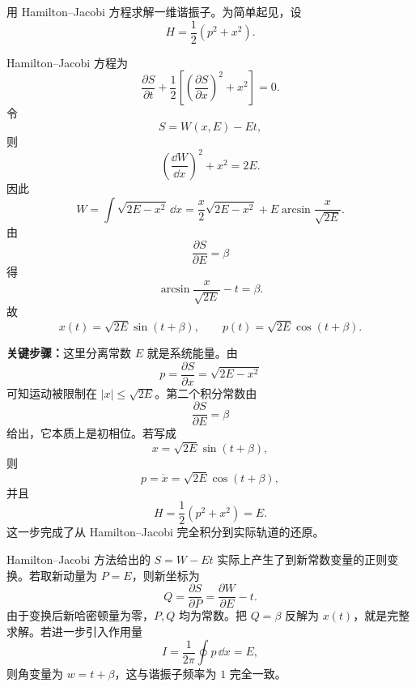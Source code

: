 \begin{question}
用 Hamilton--Jacobi 方程求解一维谐振子。为简单起见，设
\[
  H=\frac12\left(p^2+x^2\right).
\]

\begin{solution}
Hamilton--Jacobi 方程为
\[
  \frac{\partial S}{\partial t}
  +\frac12\left[\left(\frac{\partial S}{\partial x}\right)^2+x^2\right]=0.
\]
令
\[
  S=W(x,E)-Et,
\]
则
\[
  \left(\frac{\dd W}{\dd x}\right)^2+x^2=2E.
\]
因此
\[
  W=\int \sqrt{2E-x^2}\,\dd x
  =\frac{x}{2}\sqrt{2E-x^2}+E\arcsin\frac{x}{\sqrt{2E}}.
\]
由
\[
  \frac{\partial S}{\partial E}=\beta
\]
得
\[
  \arcsin\frac{x}{\sqrt{2E}}-t=\beta .
\]
故
\[
  \boxed{x(t)=\sqrt{2E}\sin(t+\beta)},
  \qquad
  \boxed{p(t)=\sqrt{2E}\cos(t+\beta)}.
\]


\medskip
\textbf{关键步骤：}这里分离常数 $E$ 就是系统能量。由
\[
  p=\frac{\partial S}{\partial x}=\sqrt{2E-x^2}
\]
可知运动被限制在 $|x|\le\sqrt{2E}$。第二个积分常数由
\[
  \frac{\partial S}{\partial E}=\beta
\]
给出，它本质上是初相位。若写成
\[
  x=\sqrt{2E}\sin(t+\beta),
\]
则
\[
  p=\dot x=\sqrt{2E}\cos(t+\beta),
\]
并且
\[
  H=\frac12(p^2+x^2)=E.
\]
这一步完成了从 Hamilton--Jacobi 完全积分到实际轨道的还原。


\medskip
Hamilton--Jacobi 方法给出的 $S=W-Et$ 实际上产生了到新常数变量的正则变换。若取新动量为 $P=E$，则新坐标为
\[
  Q=\frac{\partial S}{\partial P}=\frac{\partial W}{\partial E}-t.
\]
由于变换后新哈密顿量为零，$P,Q$ 均为常数。把 $Q=\beta$ 反解为 $x(t)$，就是完整求解。若进一步引入作用量
\[
  I=\frac{1}{2\pi}\oint p\,\dd x=E,
\]
则角变量为 $w=t+\beta$，这与谐振子频率为 $1$ 完全一致。
\end{solution}
\end{question}

